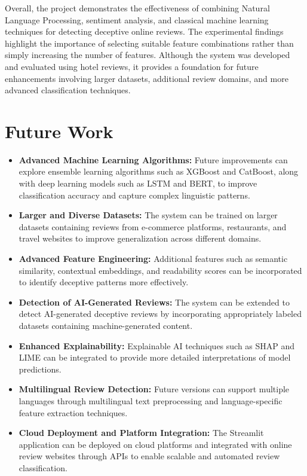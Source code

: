 \documentclass[12pt,a4paper]{report}
\begin{document}
Overall, the project demonstrates the effectiveness of
combining Natural Language Processing, sentiment analysis,
and classical machine learning techniques for detecting
deceptive online reviews. The experimental findings highlight
the importance of selecting suitable feature combinations
rather than simply increasing the number of features.
Although the system was developed and evaluated using
hotel reviews, it provides a foundation for future
enhancements involving larger datasets, additional review
domains, and more advanced classification techniques.

\newpage

\chapter{Future Work}

\begin{itemize}

    \item \textbf{Advanced Machine Learning Algorithms:}
    Future improvements can explore ensemble learning
    algorithms such as XGBoost and CatBoost, along with
    deep learning models such as LSTM and BERT, to improve
    classification accuracy and capture complex
    linguistic patterns.

    \item \textbf{Larger and Diverse Datasets:}
    The system can be trained on larger datasets containing
    reviews from e-commerce platforms, restaurants, and
    travel websites to improve generalization across
    different domains.

    \item \textbf{Advanced Feature Engineering:}
    Additional features such as semantic similarity,
    contextual embeddings, and readability scores can
    be incorporated to identify deceptive patterns
    more effectively.

    \item \textbf{Detection of AI-Generated Reviews:}
    The system can be extended to detect AI-generated
    deceptive reviews by incorporating appropriately
    labeled datasets containing machine-generated content.

    \item \textbf{Enhanced Explainability:}
    Explainable AI techniques such as SHAP and LIME
    can be integrated to provide more detailed
    interpretations of model predictions.

    \item \textbf{Multilingual Review Detection:}
    Future versions can support multiple languages
    through multilingual text preprocessing and
    language-specific feature extraction techniques.

    \item \textbf{Cloud Deployment and Platform Integration:}
    The Streamlit application can be deployed on cloud
    platforms and integrated with online review websites
    through APIs to enable scalable and automated
    review classification.

\end{itemize}
\end{document}
